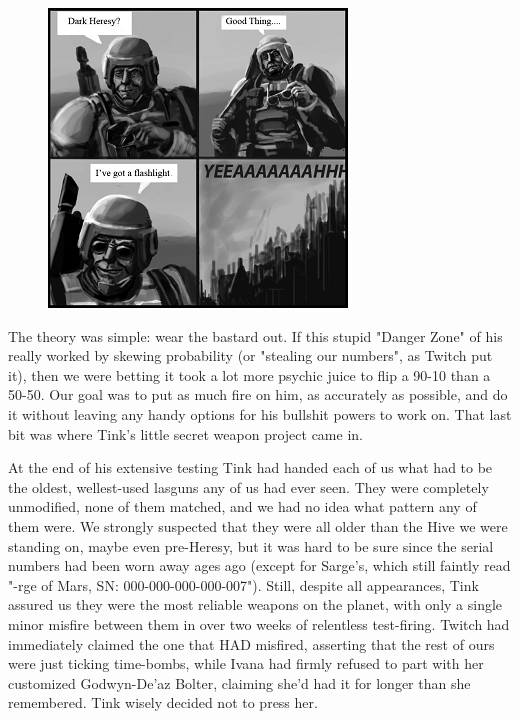 \begin{figure}
	\begin{center}
		\includegraphics[width=\figwidth]{pics/19/51.png}
	\end{center}
\end{figure}
The theory was simple: 
wear the bastard out. 
If this stupid "Danger Zone" of his really worked by skewing probability (or "stealing our numbers", as Twitch put it), then we were betting it took a lot more psychic juice to flip a 90-10 than a 50-50. 
Our goal was to put as much fire on him, as accurately as possible, and do it without leaving any handy options for his bullshit powers to work on. 
That last bit was where Tink's little secret weapon project came in.

At the end of his extensive testing Tink had handed each of us what had to be the oldest, wellest-used lasguns any of us had ever seen. 
They were completely unmodified, none of them matched, and we had no idea what pattern any of them were. 
We strongly suspected that they were all older than the Hive we were standing on, maybe even pre-Heresy, but it was hard to be sure since the serial numbers had been worn away ages ago (except for Sarge's, which still faintly read "-rge of Mars, SN: 
000-000-000-000-007"). 
Still, despite all appearances, Tink assured us they were the most reliable weapons on the planet, with only a single minor misfire between them in over two weeks of relentless test-firing. 
Twitch had immediately claimed the one that HAD misfired, asserting that the rest of ours were just ticking time-bombs, while Ivana had firmly refused to part with her customized Godwyn-De'az Bolter, claiming she'd had it for longer than she remembered. 
Tink wisely decided not to press her.

